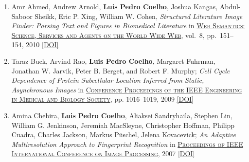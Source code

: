 \documentclass{article}
\newcommand\showdoi[1]{%
    \href{http://dx.doi.org/#1}{[DOI]}%
}
\newcommand\pubname[1]{\textsc{\uline{#1}}}
\newcommand\contribution[1]{\relax}
\begin{document}
\begin{enumerate}[resume]
\item Amr Ahmed, Andrew Arnold, \textbf{Luis Pedro Coelho}, Joshua Kangas,
Abdul-Saboor Sheikk, Eric P. Xing, William W. Cohen, \emph{Structured
Literature Image Finder: Parsing Text and Figures in Biomedical Literature} in
\pubname{Web Semantics: Science, Services and Agents on the World Wide Web},
vol.\ 8, pp.\ 151--154, 2010 \showdoi{10.1016/j.websem.2010.04.002}

\item Taraz Buck, Arvind Rao, \textbf{Luis Pedro Coelho}, Margaret Fuhrman,
Jonathan W. Jarvik, Peter B. Berget, and Robert F. Murphy; \emph{Cell Cycle
Dependence of Protein Subcellular Location Inferred from Static, Asynchronous
Images} in \pubname{Conference Proceedings of the IEEE Engineering in Medical
and Biology Society}, pp. 1016--1019, 2009 \showdoi{10.1109/IEMBS.2009.5332888}
\contribution{I helped the first author acquire relevant microscopy data.}

\item Amina Chebira, \textbf{Luis Pedro Coelho}, Aliaksei Sandryhaila, Stephen
Lin, William G. Jenkinson, Jeremiah MacSleyne, Christopher Hoffman, Philipp
Cuadra, Charles Jackson, Markus Püschel, Jelena Kovacevick; \emph{An Adaptive
Multiresolution Approach to Fingerprint Recognition} in \pubname{Proceedings of
IEEE International Conference on Image Processing}, 2007
\showdoi{10.1109/ICIP.2007.4378990}
\contribution{I developed and implemented one of the methods presented in the
paper.}

\end{enumerate}
\end{document}
